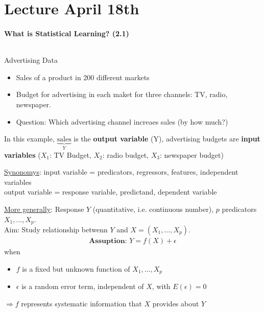 \documentclass[11pt,a4paper,numbers=endperiod]{scrartcl}
\newcommand{\id}{\hspace*{4mm}}
\newcommand{\tit}[1]{\begin{large} \underline{\text{#1}}\end{large}}
\begin{document}
	\begin{center}
		{\large \text{\today}}
	\end{center}
	
	\newpage
	\vspace{0.125\baselineskip}
	\tableofcontents %
	\newpage
	\section{Lecture April 18th}
	\vspace{0.2\baselineskip}
	
	\onehalfspacing

\paragraph{What is Statistical Learning? (2.1)}
$ $\\

\tit{Example:} Advertising Data
	\begin{itemize}[label={--}]
		\item Sales of a product in 200 different markets
		\item Budget for advertising in each maket for three channels: TV, radio, newspaper.
		\item Question: Which advertising channel increaes sales (by how much?)
	\end{itemize}
In this example, $\underbrace{\text{sales}}_{Y}$ is the \textbf{output variable} (Y), advertising budgets are \textbf{input variables} ($X_1$: TV Budget, $X_2$: radio budget, $X_3$: newspaper budget) 


\underline{Synonomys}: input variable = predicators, regressors, features, independent variables\\
\hspace*{17.2mm} output variable = response variable, predictand, dependent variable

\underline{More generally}: Response $Y$ (quantitative, i.e. continuous number), $p$ predicators $X_1, \ldots, X_p$.\\
\id Aim: Study relationship betwenn $Y$ and $X = (X_1, \ldots, X_p)$.
\begin{align*}
	\textbf{Assuption: } Y = f(X) + \epsilon
\end{align*} 
when
\begin{itemize}[label={--}]
	\item $f$ is a fixed but unknown function of $X_1, \ldots, X_p$
	\item $\epsilon$ is a random error term, independent of $X$, with $E(\epsilon) = 0$
\end{itemize}
$\Rightarrow f$ represents systematic information that $X$ provides about $Y$
\end{document}
